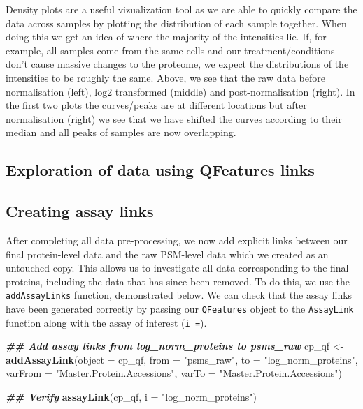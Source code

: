 \documentclass[9pt,a4paper,]{extarticle}
\newenvironment{Shaded}{\begin{snugshade}}{\end{snugshade}}
\newcommand{\AttributeTok}[1]{\textcolor[rgb]{0.13,0.29,0.53}{#1}}
\newcommand{\DocumentationTok}[1]{\textcolor[rgb]{0.56,0.35,0.01}{\textbf{\textit{#1}}}}
\newcommand{\FunctionTok}[1]{\textcolor[rgb]{0.13,0.29,0.53}{\textbf{#1}}}
\newcommand{\NormalTok}[1]{#1}
\newcommand{\OtherTok}[1]{\textcolor[rgb]{0.56,0.35,0.01}{#1}}
\newcommand{\StringTok}[1]{\textcolor[rgb]{0.31,0.60,0.02}{#1}}
\begin{document}
Density plots are a useful vizualization tool as we are able to quickly compare
the data across samples by plotting the distribution of each sample together.
When doing this we get an idea of where the majority of the intensities lie. If,
for example, all samples come from the same cells and our treatment/conditions
don't cause massive changes to the proteome, we expect the distributions of the
intensities to be roughly the same. Above, we see that the raw data before
normalisation (left), log2 transformed (middle) and post-normalisation (right).
In the first two plots the curves/peaks are at different locations but after
normalisation (right) we see that we have shifted the curves according to their
median and all peaks of samples are now overlapping.

\subsection{Exploration of data using QFeatures links}\label{exploration-of-data-using-qfeatures-links}

\subsection{Creating assay links}\label{creating-assay-links}

After completing all data pre-processing, we now add explicit links between our
final protein-level data and the raw PSM-level data which we created as an
untouched copy. This allows us to investigate all data corresponding to the
final proteins, including the data that has since been removed. To do this, we
use the \texttt{addAssayLinks} function, demonstrated below. We can check that the
assay links have been generated correctly by passing our \texttt{QFeatures} object to
the \texttt{AssayLink} function along with the assay of interest (\texttt{i\ =}).

\begin{Shaded}
\begin{Highlighting}[]
\DocumentationTok{\#\# Add assay links from log\_norm\_proteins to psms\_raw}
\NormalTok{cp\_qf }\OtherTok{\textless{}{-}} \FunctionTok{addAssayLink}\NormalTok{(}\AttributeTok{object =}\NormalTok{ cp\_qf, }
                      \AttributeTok{from =} \StringTok{"psms\_raw"}\NormalTok{,}
                      \AttributeTok{to =} \StringTok{"log\_norm\_proteins"}\NormalTok{,}
                      \AttributeTok{varFrom =} \StringTok{"Master.Protein.Accessions"}\NormalTok{,}
                      \AttributeTok{varTo =} \StringTok{"Master.Protein.Accessions"}\NormalTok{)}

\DocumentationTok{\#\# Verify}
\FunctionTok{assayLink}\NormalTok{(cp\_qf, }
          \AttributeTok{i =} \StringTok{"log\_norm\_proteins"}\NormalTok{)}
\end{Highlighting}
\end{Shaded}
\end{document}
